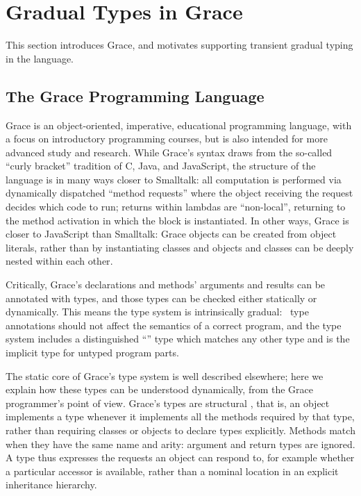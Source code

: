 
\section{Gradual Types in Grace}
\label{sec:background}

This section introduces Grace, and 
motivates supporting transient gradual typing in the language.

\subsection{The Grace Programming Language}
\label{ssec:grace}

Grace is an object-oriented, imperative, educational programming language,
with a focus on introductory programming courses,
but is also intended for more advanced study and research\citep{graceOnward12,graceSigcse13}.
%
While Grace's syntax draws
from the so-called ``curly bracket'' tradition of C, Java, and
JavaScript, the structure of the language
is in many ways closer to Smalltalk:
all computation is performed via dynamically dispatched
``method requests'' where the object receiving the request
decides which code to run;
returns within lambdas are ``non-local'', returning to the method
activation in which the block is instantiated\citep{bluebook}. 
In other ways, Grace is closer to JavaScript than Smalltalk: Grace
objects can be created from object literals, rather than by
instantiating classes\citep{Black2007-emeraldHOPL,JonesECOOP2016}
and objects and classes can be deeply nested within each 
other\citep{betabook}.

Critically, Grace's declarations and methods' arguments
and results can be annotated with types, and those types can be checked
either statically or dynamically. This means the type system is
intrinsically gradual:%
%
~type annotations should not affect the semantics of a correct
program\citep{XXXSiek2015}, and the type system
includes a distinguished ``'' type which matches any other type
and is the implicit type for untyped program parts.

The static core of Grace's type system is well described
elsewhere\citep{TimJonesThesis};
here we explain how
these types can be understood 
dynamically, from the Grace programmer's point of view.
Grace's types are structural \citep{graceOnward12},
that is, an object implements a type whenever it
implements all the methods required by that type,
rather than requiring classes or objects to declare types explicitly.
Methods match when they have the same name and arity:
argument and return types are ignored.
A type thus expresses the requests an object can respond to,
for example whether a particular accessor is available,
rather than a nominal location in an explicit inheritance hierarchy.

